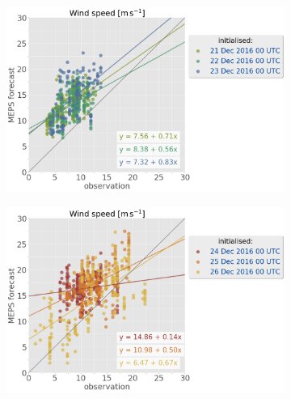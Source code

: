 \begin{figure}\ContinuedFloat
	\begin{subfigure}[b]{0.49\textwidth}
		\includegraphics[trim={0.cm 0cm 12.5cm 0cm},clip,
		width=\textwidth]{./fig_sfc_ws/obs_model_20161221_23_00}
		\caption{}\label{fig:scat:ws2123}
	\end{subfigure}
	\begin{subfigure}[b]{0.49\textwidth}
		\includegraphics[trim={0.cm 0cm 12.5cm 0cm},clip,
		width=\textwidth]{./fig_sfc_ws/obs_model_20161224_26_00}
		\caption{}\label{fig:scat:ws2426}
	\end{subfigure}

\end{figure}

